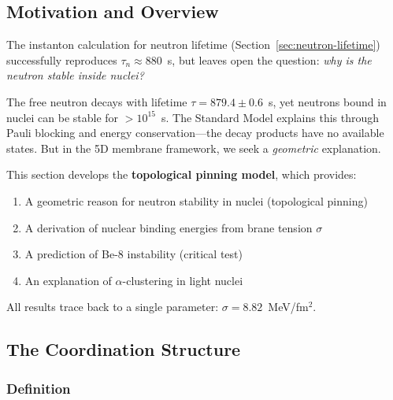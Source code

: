\subsection{Motivation and Overview}
\label{subsec:m6-motivation}

The instanton calculation for neutron lifetime (Section~\ref{sec:neutron-lifetime}) successfully reproduces $\tau_n \approx 880$~s, but leaves open the question: \emph{why is the neutron stable inside nuclei?}

The free neutron decays with lifetime $\tau = 879.4 \pm 0.6$~s, yet neutrons bound in nuclei can be stable for $>10^{15}$~s. The Standard Model explains this through Pauli blocking and energy conservation—the decay products have no available states. But in the 5D membrane framework, we seek a \emph{geometric} explanation.

This section develops the \textbf{topological pinning model}, which provides:
\begin{enumerate}
    \item A geometric reason for neutron stability in nuclei (topological pinning)
    \item A derivation of nuclear binding energies from brane tension $\sigma$
    \item A prediction of Be-8 instability (critical test)
    \item An explanation of $\alpha$-clustering in light nuclei
\end{enumerate}

All results trace back to a single parameter: $\sigma = 8.82$~MeV/fm$^2$.

\subsection{The Coordination Structure}
\label{subsec:m6-structure}

\subsubsection{Definition}

